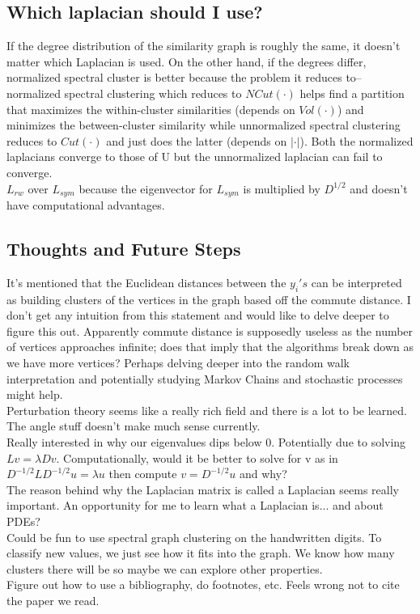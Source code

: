 \documentclass{article}
\begin{document}
\subsection{Which laplacian should I use?}
If the degree distribution of the similarity graph is roughly the same, it doesn't matter which Laplacian is used. On the other hand, if the degrees differ, normalized spectral cluster is better because the problem it reduces to-- normalized spectral clustering which reduces to $NCut(\cdot)$ helps find a partition that maximizes the within-cluster similarities (depends on $Vol(\cdot)$) and minimizes the between-cluster similarity while unnormalized spectral clustering reduces to $Cut(\cdot)$ and just does the latter (depends on $|\cdot|$). Both the normalized laplacians converge to those of U but the unnormalized laplacian can fail to converge. \\[1em]
$L_{rw}$ over $L_{sym}$ because the eigenvector for $L_{sym}$ is multiplied by $D^{1/2}$ and doesn't have computational advantages. 
\subsection{Thoughts and Future Steps}
It's mentioned that the Euclidean distances between the $y_i's$ can be interpreted as building clusters of the vertices in the graph based off the commute distance. I don't get any intuition from this statement and would like to delve deeper to figure this out. Apparently commute distance is supposedly useless as the number of vertices approaches infinite; does that imply that the algorithms break down as we have more vertices? Perhaps delving deeper into the random walk interpretation and potentially studying Markov Chains and stochastic processes might help. \\[1em]
Perturbation theory seems like a really rich field and there is a lot to be learned. The angle stuff doesn't make much sense currently. \\[1em]
Really interested in why our eigenvalues dips below 0. Potentially due to solving $Lv = \lambda Dv$. Computationally, would it be better to solve for v as in $D^{-1/2}LD^{-1/2}u = \lambda u$ then compute $v=D^{-1/2}u$ and why?\\[1em]
The reason behind why the Laplacian matrix is called a Laplacian seems really important. An opportunity for me to learn what a Laplacian is... and about PDEs? \\[1em]
Could be fun to use spectral graph clustering on the handwritten digits. To classify new values, we just see how it fits into the graph. We know how many clusters there will be so maybe we can explore other properties. \\[1em]
Figure out how to use a bibliography, do footnotes, etc. Feels wrong not to cite the paper we read. 
\end{document}

